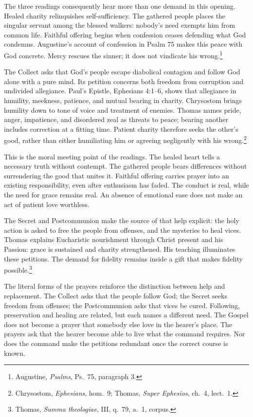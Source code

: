The three readings consequently hear more than one demand in this opening. Healed charity relinquishes self-sufficiency. The gathered people places the singular servant among the blessed walkers: nobody's need exempts him from common life. Faithful offering begins when confession ceases defending what God condemns. Augustine's account of confession in Psalm 75 makes this peace with God concrete. Mercy rescues the sinner; it does not vindicate his wrong.\footnote{Augustine, \textit{Psalms}, Ps.~75, paragraph 3.}

The Collect asks that God's people escape diabolical contagion and follow God alone with a pure mind. Its petition concerns both freedom from corruption and undivided allegiance. Paul's Epistle, Ephesians 4:1--6, shows that allegiance in humility, meekness, patience, and mutual bearing in charity. Chrysostom brings humility down to tone of voice and treatment of enemies. Thomas names pride, anger, impatience, and disordered zeal as threats to peace; bearing another includes correction at a fitting time. Patient charity therefore seeks the other's good, rather than either humiliating him or agreeing negligently with his wrong.\footnote{Chrysostom, \textit{Ephesians}, hom.~9; Thomas, \textit{Super Ephesios}, ch.~4, lect.~1.}

This is the moral meeting point of the readings. The healed heart tells a necessary truth without contempt. The gathered people bears differences without surrendering the good that unites it. Faithful offering carries prayer into an existing responsibility, even after enthusiasm has faded. The conduct is real, while the need for grace remains real. An absence of emotional ease does not make an act of patient love worthless.

The Secret and Postcommunion make the source of that help explicit: the holy action is asked to free the people from offenses, and the mysteries to heal vices. Thomas explains Eucharistic nourishment through Christ present and his Passion: grace is sustained and charity strengthened. His teaching illuminates these petitions. The demand for fidelity remains inside a gift that makes fidelity possible.\footnote{Thomas, \textit{Summa theologiae}, III, q.~79, a.~1, corpus.}

The literal forms of the prayers reinforce the distinction between help and replacement. The Collect asks that the people follow God; the Secret seeks freedom from offenses; the Postcommunion asks that vices be cured. Following, preservation and healing are related, but each names a different need. The Gospel does not become a prayer that somebody else love in the hearer's place. The prayers ask that the hearer become able to live what the command requires. Nor does the command make the petitions redundant once the correct course is known.

